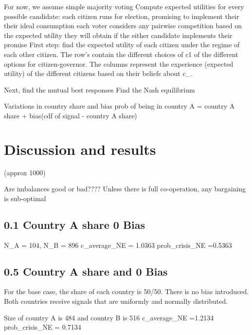 \documentclass[11pt,preprint, authoryear]{elsarticle}
\numberwithin{equation}{section}
\numberwithin{figure}{section}
\numberwithin{table}{section}
\begin{document}
For now, we assume simple majority voting Compute expected utilities for
every possible candidate: each citizen runs for election, promising to
implement their their ideal consumption each voter considers any
pairwise competition based on the expected utility they will obtain if
the either candidate implements their promise First step: find the
expected utility of each citizen under the regime of each other citizen.
The row's contain the different choices of c1 of the different options
for citizen-governor. The columns represent the experience (expected
utility) of the different citizens based on their beliefs about c\_.

Next, find the mutual best responses Find the Nash equilibrium

Variations in country share and bias prob of being in country A =
country A share + bias(cdf of signal - country A share)

\hypertarget{discussion-and-results}{%
\section{Discussion and results}\label{discussion-and-results}}

(approx 1000)

Are imbalances good or bad???? Unless there is full co-operation, any
bargaining is sub-optimal

\hypertarget{country-a-share-0-bias}{%
\subsection*{0.1 Country A share 0 Bias}\label{country-a-share-0-bias}}

N\_A = 104, N\_B = 896 c\_average\_NE = 1.0363 prob\_crisis\_NE =0.5363

\hypertarget{country-a-share-and-0-bias}{%
\subsection*{0.5 Country A share and 0
Bias}\label{country-a-share-and-0-bias}}

For the base case, the share of each country is 50/50. There is no bias
introduced. Both countries receive signals that are uniformly and
normally distributed.

Size of country A is 484 and country B is 516 c\_average\_NE =1.2134
prob\_crisis\_NE = 0.7134
\end{document}
